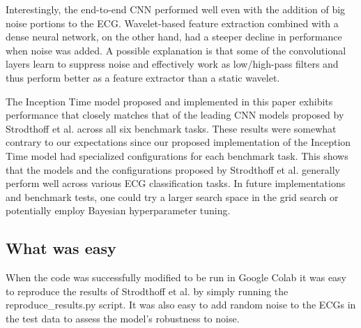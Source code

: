 Interestingly, the end-to-end CNN performed well even with the addition of big noise portions to the ECG. Wavelet-based feature extraction combined with a dense neural network, on the other hand, had a steeper decline in performance when noise was added. A possible explanation is that some of the convolutional layers learn to suppress noise and effectively work as low/high-pass filters and thus perform better as a feature extractor than a static wavelet.

The Inception Time model proposed and implemented in this paper exhibits performance that closely matches that of the leading CNN models proposed by Strodthoff et al. across all six benchmark tasks. These results were somewhat contrary to our expectations since our proposed implementation of the Inception Time model had specialized configurations for each benchmark task. This shows that the models and the configurations proposed by Strodthoff et al. generally perform well across various ECG classification tasks. In future implementations and benchmark tests, one could try a larger search space in the grid search or potentially employ Bayesian hyperparameter tuning.


\subsection{What was easy}


When the code was successfully modified to be run in Google Colab it was easy to reproduce the results of Strodthoff et al. by simply running the reproduce\_results.py script. It was also easy to add random noise to the ECGs in the test data to assess the model's robustness to noise.


